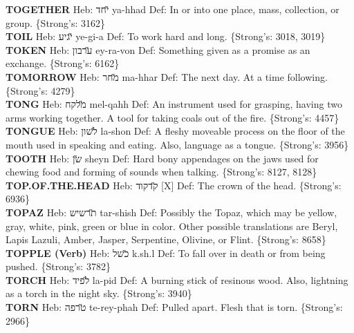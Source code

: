 {\textbf{TOGETHER} Heb: {\large\H יחד} ya-hhad Def: In or into one place, mass, collection, or group. \{Strong's: 3162\}\hfill{}\\

\textbf{TOIL} Heb: {\large\H יגיע} ye-gi-a Def: To work hard and long. \{Strong's: 3018, 3019\}\hfill{}\\

\textbf{TOKEN} Heb: {\large\H ערבון} ey-ra-von Def: Something given as a promise as an exchange. \{Strong's: 6162\}\hfill{}\\

\textbf{TOMORROW} Heb: {\large\H מחר} ma-hhar Def: The next day. At a time following. \{Strong's: 4279\}\hfill{}\\

\textbf{TONG} Heb: {\large\H מלקח} mel-qahh Def: An instrument used for grasping, having two arms working together. A tool for taking coals out of the fire. \{Strong's: 4457\}\hfill{}\\

\textbf{TONGUE} Heb: {\large\H לשון} la-shon Def: A fleshy moveable process on the floor of the mouth used in speaking and eating. Also, language as a tongue. \{Strong's: 3956\}\hfill{}\\

\textbf{TOOTH} Heb: {\large\H שן} sheyn Def: Hard bony appendages on the jaws used for chewing food and forming of sounds when talking. \{Strong's: 8127, 8128\}\hfill{}\\

\textbf{TOP.OF.THE.HEAD} Heb: {\large\H קדקוד} {[}X{]} Def: The crown of the head. \{Strong's: 6936\}\hfill{}\\

\textbf{TOPAZ} Heb: {\large\H תרשיש} tar-shish Def: Possibly the Topaz, which may be yellow, gray, white, pink, green or blue in color. Other possible translations are Beryl, Lapis Lazuli, Amber, Jasper, Serpentine, Olivine, or Flint. \{Strong's: 8658\}\hfill{}\\

\textbf{TOPPLE (Verb)} Heb: {\large\H כשל} k.sh.l Def: To fall over in death or from being pushed. \{Strong's: 3782\}\hfill{}\\

\textbf{TORCH} Heb: {\large\H לפיד} la-pid Def: A burning stick of resinous wood. Also, lightning as a torch in the night sky. \{Strong's: 3940\}\hfill{}\\

\textbf{TORN} Heb: {\large\H טרפה} te-rey-phah Def: Pulled apart. Flesh that is torn. \{Strong's: 2966\}\hfill{}\\

}
